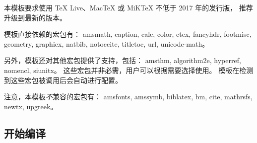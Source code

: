 \documentclass[a4paper]{ltxdoc}
\DeclareRobustCommand\pkg{\textsf}
\begin{document}
本模板要求使用 TeX Live、MacTeX 或 MiKTeX 不低于 2017 年的发行版，
推荐升级到最新的版本。

模板直接依赖的宏包有：
\pkg{amsmath},
\pkg{caption},
\pkg{calc},
\pkg{color},
\pkg{ctex},
\pkg{fancyhdr},
\pkg{footmisc},
\pkg{geometry},
\pkg{graphicx},
\pkg{natbib},
\pkg{notoccite},
\pkg{titletoc},
\pkg{url},
\pkg{unicode-math}。

另外，模板还对其他宏包提供了支持，包括：
\pkg{amsthm},
\pkg{algorithm2e},
\pkg{hyperref},
\pkg{nomencl},
\pkg{siunitx}。
这些宏包并非必需，用户可以根据需要选择使用。
模板在检测到这些宏包被调用后会自动进行配置。

注意，本模板\emph{不}兼容的宏包有：
\pkg{amsfonts},
\pkg{amssymb},
\pkg{biblatex},
\pkg{bm},
\pkg{cite},
\pkg{mathrsfs},
\pkg{newtx},
\pkg{upgreek}。


\subsection{开始编译}
\end{document}

